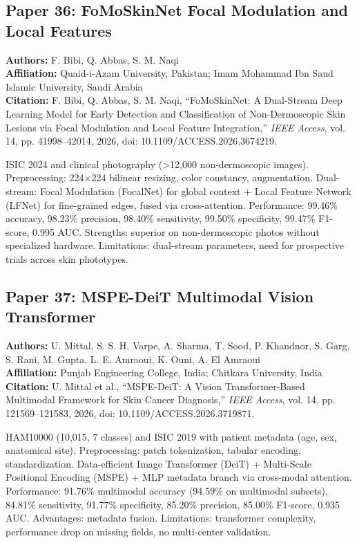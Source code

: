 \documentclass[conference]{IEEEtran}
\begin{document}
\subsection{Paper 36: FoMoSkinNet Focal Modulation and Local Features}

\noindent\textbf{Authors:} F. Bibi, Q. Abbas, S. M. Naqi\\
\textbf{Affiliation:} Quaid-i-Azam University, Pakistan; Imam Mohammad Ibn Saud Islamic University, Saudi Arabia\\
\textbf{Citation:} F. Bibi, Q. Abbas, S. M. Naqi, ``FoMoSkinNet: A Dual-Stream Deep Learning Model for Early Detection and Classification of Non-Dermoscopic Skin Lesions via Focal Modulation and Local Feature Integration,'' \textit{IEEE Access}, vol. 14, pp. 41998--42014, 2026, doi: 10.1109/ACCESS.2026.3674219.

ISIC 2024 and clinical photography (>12,000 non-dermoscopic images). Preprocessing: 224×224 bilinear resizing, color constancy, augmentation. Dual-stream: Focal Modulation (FocalNet) for global context + Local Feature Network (LFNet) for fine-grained edges, fused via cross-attention. Performance: 99.46\% accuracy, 98.23\% precision, 98.40\% sensitivity, 99.50\% specificity, 99.47\% F1-score, 0.995 AUC. Strengths: superior on non-dermoscopic photos without specialized hardware. Limitations: dual-stream parameters, need for prospective trials across skin phototypes.

\subsection{Paper 37: MSPE-DeiT Multimodal Vision Transformer}

\noindent\textbf{Authors:} U. Mittal, S. S. H. Varpe, A. Sharma, T. Sood, P. Khandnor, S. Garg, S. Rani, M. Gupta, L. E. Amraoui, K. Ouni, A. El Amraoui\\
\textbf{Affiliation:} Punjab Engineering College, India; Chitkara University, India\\
\textbf{Citation:} U. Mittal et al., ``MSPE-DeiT: A Vision Transformer-Based Multimodal Framework for Skin Cancer Diagnosis,'' \textit{IEEE Access}, vol. 14, pp. 121569--121583, 2026, doi: 10.1109/ACCESS.2026.3719871.

HAM10000 (10,015, 7 classes) and ISIC 2019 with patient metadata (age, sex, anatomical site). Preprocessing: patch tokenization, tabular encoding, standardization. Data-efficient Image Transformer (DeiT) + Multi-Scale Positional Encoding (MSPE) + MLP metadata branch via cross-modal attention. Performance: 91.76\% multimodal accuracy (94.59\% on multimodal subsets), 84.81\% sensitivity, 91.77\% specificity, 85.20\% precision, 85.00\% F1-score, 0.935 AUC. Advantages: metadata fusion. Limitations: transformer complexity, performance drop on missing fields, no multi-center validation.
\end{document}
